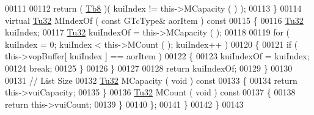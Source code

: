 \begin{DoxyCode}
00111 
00112             \textcolor{keywordflow}{return} ( \mbox{\hyperlink{namespace_g_n_common_a8115dc7ed53b6e5b52e6bfde1632ea74}{Tb8}} )( kuiIndex != this->MCapacity ( ) );
00113          \}
00114          \textcolor{keyword}{virtual} \mbox{\hyperlink{namespace_g_n_common_a941b527ef318f318aed7903dc832b7e4}{Tu32}} MIndexOf ( \textcolor{keyword}{const} GTcType& aorItem )\textcolor{keyword}{ const}
00115 \textcolor{keyword}{         }\{
00116             \mbox{\hyperlink{namespace_g_n_common_a941b527ef318f318aed7903dc832b7e4}{Tu32}} kuiIndex;
00117             \mbox{\hyperlink{namespace_g_n_common_a941b527ef318f318aed7903dc832b7e4}{Tu32}} kuiIndexOf = this->MCapacity ( );
00118 
00119             \textcolor{keywordflow}{for} ( kuiIndex = 0; kuiIndex < this->MCount ( ); kuiIndex++ )
00120             \{
00121                \textcolor{keywordflow}{if} ( this->vopBuffer[ kuiIndex ] == aorItem )
00122                \{
00123                   kuiIndexOf = kuiIndex;
00124                   \textcolor{keywordflow}{break};
00125                \}
00126             \}
00127 
00128             \textcolor{keywordflow}{return} kuiIndexOf;
00129          \}
00130 
00131          \textcolor{comment}{// List Size}
00132          \mbox{\hyperlink{namespace_g_n_common_a941b527ef318f318aed7903dc832b7e4}{Tu32}} MCapacity ( \textcolor{keywordtype}{void} )\textcolor{keyword}{ const}
00133 \textcolor{keyword}{         }\{
00134             \textcolor{keywordflow}{return} this->vuiCapacity;
00135          \}
00136          \mbox{\hyperlink{namespace_g_n_common_a941b527ef318f318aed7903dc832b7e4}{Tu32}} MCount    ( \textcolor{keywordtype}{void} )\textcolor{keyword}{ const}
00137 \textcolor{keyword}{         }\{
00138             \textcolor{keywordflow}{return} this->vuiCount;
00139          \}
00140       \};
00141    \}
00142 \}
00143 
\end{DoxyCode}
